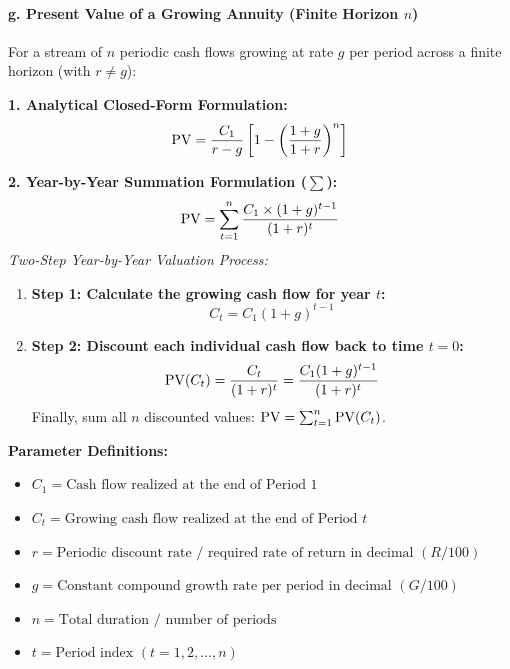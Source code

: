 \begin{formulabox}
\paragraph{g. Present Value of a Growing Annuity (Finite Horizon $n$)}
For a stream of $n$ periodic cash flows growing at rate $g$ per period across a finite horizon (with $r \neq g$):

\vspace{0.3em}
\textbf{1. Analytical Closed-Form Formulation:}
\begin{equation}
    \operatorname{PV} = \frac{C_1}{r - g} \left[ 1 - \left(\frac{1 + g}{1 + r}\right)^n \right]
\end{equation}

\vspace{0.3em}
\textbf{2. Year-by-Year Summation Formulation ($\sum$):}
\begin{equation}
    \operatorname{PV} = \sum_{t=1}^{n} \frac{C_1 \times (1 + g)^{t-1}}{(1 + r)^t}
\end{equation}
\textit{Two-Step Year-by-Year Valuation Process:}
\begin{enumerate}[leftmargin=*, noitemsep]
    \item \textbf{Step 1: Calculate the growing cash flow for year $t$:}
    \begin{equation*}
        C_t = C_1(1 + g)^{t-1}
    \end{equation*}
    \item \textbf{Step 2: Discount each individual cash flow back to time $t = 0$:}
    \begin{equation*}
        \operatorname{PV}(C_t) = \frac{C_t}{(1 + r)^t} = \frac{C_1(1 + g)^{t-1}}{(1 + r)^t}
    \end{equation*}
    Finally, sum all $n$ discounted values: $\operatorname{PV} = \sum_{t=1}^{n} \operatorname{PV}(C_t)$.
\end{enumerate}

\vspace{0.3em}
\textbf{Parameter Definitions:}
\begin{itemize}[noitemsep]
    \item $C_1 = \text{Cash flow realized at the end of Period 1}$
    \item $C_t = \text{Growing cash flow realized at the end of Period } t$
    \item $r = \text{Periodic discount rate / required rate of return in decimal } (R/100)$
    \item $g = \text{Constant compound growth rate per period in decimal } (G/100)$
    \item $n = \text{Total duration / number of periods}$
    \item $t = \text{Period index } (t = 1, 2, \dots, n)$
\end{itemize}
\end{formulabox}

